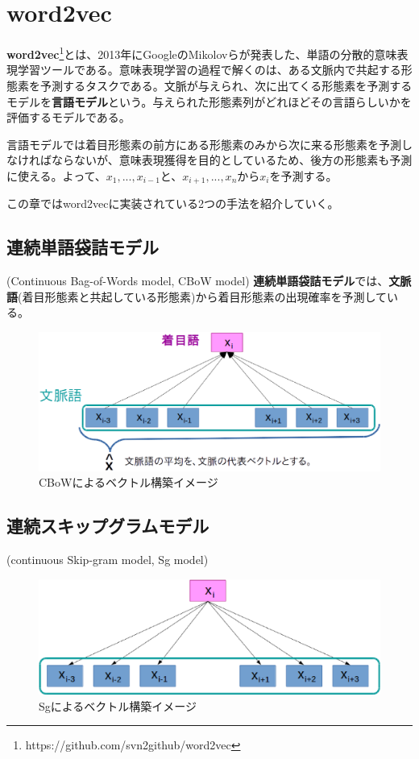 \chapter{word2vec}
\textbf{word2vec}\footnote{https://github.com/svn2github/word2vec}とは、2013年にGoogleのMikolovらが発表した、単語の分散的意味表現学習ツールである。意味表現学習の過程で解くのは、ある文脈内で共起する形態素を予測するタスクである。文脈が与えられ、次に出てくる形態素を予測するモデルを\textbf{言語モデル}という。与えられた形態素列がどれほどその言語らしいかを評価するモデルである。

言語モデルでは着目形態素の前方にある形態素のみから次に来る形態素を予測しなければならないが、意味表現獲得を目的としているため、後方の形態素も予測に使える。よって、$x_1,...,x_{i-1}$と、$x_{i+1},...,x_n$から$x_i$を予測する。

この章ではword2vecに実装されている2つの手法を紹介していく。

\section{連続単語袋詰モデル}(Continuous Bag-of-Words model, CBoW model)
\textbf{連続単語袋詰モデル}では、\textbf{文脈語}(着目形態素と共起している形態素)から着目形態素の出現確率を予測している。
\begin{figure}[h]
  \centering
  \includegraphics[width=12.5cm]{../images/CBoW.eps}
  \caption{CBoWによるベクトル構築イメージ}
\end{figure}
\section{連続スキップグラムモデル}(continuous Skip-gram model, Sg model)

\begin{figure}[h]
  \centering
  \includegraphics[width=12.5cm]{../images/Sg.eps}
  \caption{Sgによるベクトル構築イメージ}
\end{figure}
